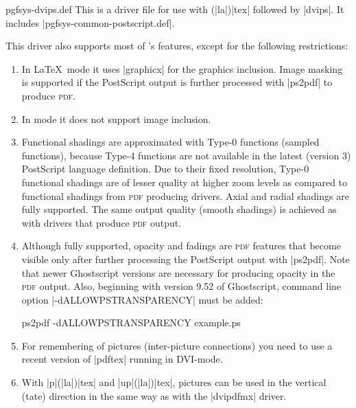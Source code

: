 \begin{filedescription}{pgfsys-dvips.def}
    This is a driver file for use with (|la|)|tex| followed by |dvips|. It
    includes |pgfsys-common-postscript.def|.

    This driver also supports most of \pgfname's features, except for the
    following restrictions:
    \begin{enumerate}
        \item In \LaTeX\ mode it uses |graphicx| for the graphics inclusion.
            Image masking is supported if the PostScript output is further
            processed with |ps2pdf| to produce \textsc{pdf}.
        \item In  mode it does not support image inclusion.
        \item Functional shadings are approximated with Type-0 functions
            (sampled functions), because Type-4 functions are not available in
            the latest (version 3) PostScript language definition. Due to
            their fixed resolution, Type-0 functional shadings are of lesser
            quality at higher zoom levels as compared to functional shadings
            from \textsc{pdf} producing drivers. Axial and radial shadings are
            fully supported. The same output quality (smooth shadings) is
            achieved as with drivers that produce \textsc{pdf} output.
        \item Although fully supported, opacity and fadings are \textsc{pdf}
            features that become visible only after further processing the
            PostScript output with |ps2pdf|. Note that newer Ghostscript
            versions are necessary for producing opacity in the \textsc{pdf}
            output. Also, beginning with version 9.52 of Ghostscript, command
            line option |-dALLOWPSTRANSPARENCY| must be added:
\begin{codeexample}
ps2pdf -dALLOWPSTRANSPARENCY example.ps
\end{codeexample}
        \item For remembering of pictures (inter-picture connections) you
            need to use a recent version of |pdftex| running in DVI-mode.
        \item With |p|(|la|)|tex| and |up|(|la|)|tex|, pictures can be used
            in the vertical (tate) direction in the same way as with the
            |dvipdfmx| driver.
    \end{enumerate}
\end{filedescription}


